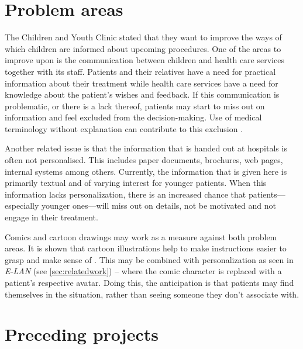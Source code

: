 \section{Problem areas}
\label{sec:problemareas}

The Children and Youth Clinic stated that they want to improve the ways of which children are informed about upcoming procedures. One of the areas to improve upon is the communication between children and health care services together with its staff. Patients and their relatives have a need for practical information about their treatment while health care services have a need for knowledge about the patient's wishes and feedback. If this communication is problematic, or there is a lack thereof, patients may start to miss out on information and feel excluded from the decision-making. Use of medical terminology without explanation can contribute to this exclusion \autocite{coyne2006}.

Another related issue is that the information that is handed out at hospitals is often not personalised. This includes paper documents, brochures, web pages, internal systems among others. Currently, the information that is given here is primarily textual and of varying interest for younger patients. When this information lacks personalization, there is an increased chance that patients---especially younger ones---will miss out on details, not be motivated and not engage in their treatment.

Comics and cartoon drawings may work as a measure against both problem areas. It is shown that cartoon illustrations help to make instructions easier to grasp and make sense of \autocite{delp1996}. This may be combined with personalization as seen in \emph{E-LAN} (see \autoref{sec:relatedwork}) -- where the comic character is replaced with a patient's respective avatar. Doing this, the anticipation is that patients may find themselves in the situation, rather than seeing someone they don't associate with.


\section{Preceding projects}

